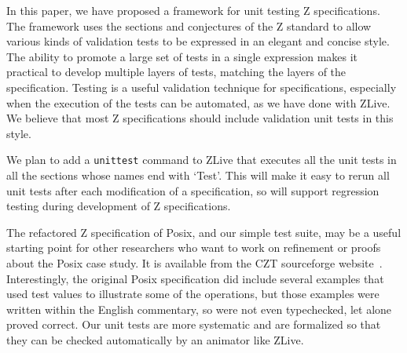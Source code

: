 \documentclass{llncs}
\begin{document}
In this paper, we have proposed a framework for unit testing Z
specifications.  The framework uses the sections and conjectures of
the Z standard to allow various kinds of validation tests to be
expressed in an elegant and concise style.  The ability to promote a
large set of tests in a single expression makes it practical to
develop multiple layers of tests, matching the layers of the
specification.  Testing is a useful validation technique for
specifications, especially when the execution of the tests can be
automated, as we have done with ZLive.  We believe that most Z
specifications should include validation unit tests in this style.

We plan to add a \texttt{unittest} command to ZLive that executes all the
unit tests in all the sections whose names end with `Test'.  This will
make it easy to rerun all unit tests after each modification of a
specification, so will support regression testing during development
of Z specifications.

The refactored Z specification of Posix, and our simple test suite,
may be a useful starting point for other researchers who want to work
on refinement or proofs about the Posix case study.  It is available
from the CZT sourceforge website~\cite{CZT}.  Interestingly, the
original Posix specification did include several examples that used
test values to illustrate some of the operations, but those examples
were written within the English commentary, so were not even
typechecked, let alone proved correct.  Our unit tests are more
systematic and are formalized so that they can be checked
automatically by an animator like ZLive.


%
%


%
\end{document}
